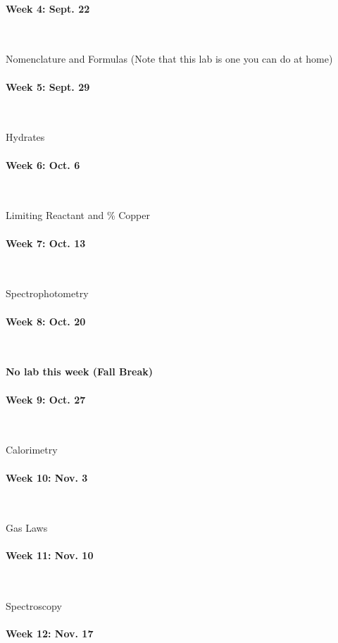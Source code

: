 \documentclass[12pt, letterpaper]{article}
\begin{document}
\paragraph{Week 4: Sept. 22}~

Nomenclature and Formulas (Note that this lab is one you can do at home)

\paragraph{Week 5: Sept. 29}~

Hydrates

\paragraph{Week 6: Oct. 6}~

Limiting Reactant and \% Copper

\paragraph{Week 7: Oct. 13}~

Spectrophotometry

\paragraph{Week 8: Oct. 20}~

\textbf{No lab this week (Fall Break)}

\paragraph{Week 9: Oct. 27}~

Calorimetry

\paragraph{Week 10: Nov. 3}~

Gas Laws

\paragraph{Week 11: Nov. 10}~

Spectroscopy

\paragraph{Week 12: Nov. 17}~
\end{document}
